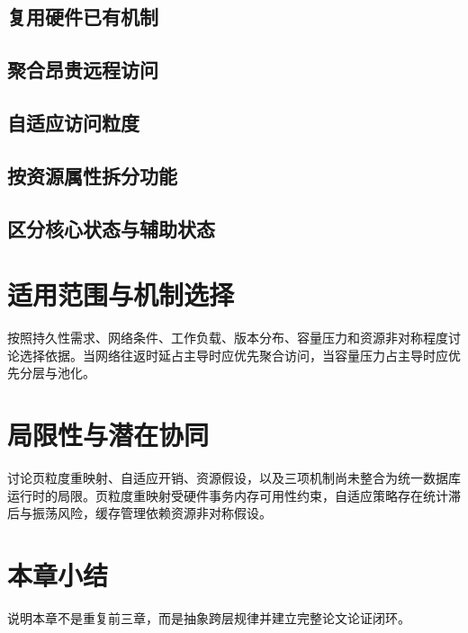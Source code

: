 \subsection{复用硬件已有机制}
\subsection{聚合昂贵远程访问}
\subsection{自适应访问粒度}
\subsection{按资源属性拆分功能}
\subsection{区分核心状态与辅助状态}
\section{适用范围与机制选择}
按照持久性需求、网络条件、工作负载、版本分布、容量压力和资源非对称程度讨论选择依据。当网络往返时延占主导时应优先聚合访问\cite{zamanianEnd2017,binnigEnd2016}，当容量压力占主导时应优先分层与池化\cite{zhongManaging2024,liPond2023}。
\section{局限性与潜在协同}
讨论页粒度重映射、自适应开销、资源假设，以及三项机制尚未整合为统一数据库运行时的局限。页粒度重映射受硬件事务内存可用性约束\cite{intelTsxAdvisory2019,linuxTsx2019}，自适应策略存在统计滞后与振荡风险\cite{zamanianChiller2020}，缓存管理依赖资源非对称假设\cite{caoPolardb2021}。
\section{本章小结}
说明本章不是重复前三章，而是抽象跨层规律并建立完整论文论证闭环。
